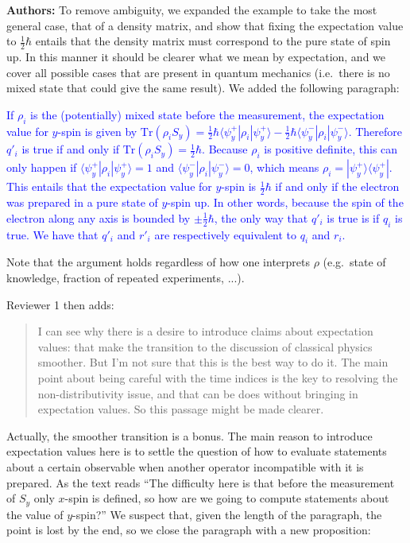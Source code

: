 \documentclass[11pt, executivepaper]{article}
\begin{document}
\begin{enumerate}
\vspace{2mm}

\textbf{Authors:} To remove ambiguity, we expanded the example to take the most general case, that of a density matrix, and show that fixing the expectation value to $\frac{1}{2} \hbar$ entails that the density matrix must correspond to the pure state of spin up. In this manner it should be clearer what we mean by expectation, and we cover all possible cases that are present in quantum mechanics (i.e.\ there is no mixed state that could give the same result). We added the following paragraph:

\textcolor{blue}{If $\rho_i$ is the (potentially) mixed state before the measurement, the expectation value for $y$-spin is given by $\text{Tr}(\rho_i S_y) = \frac{1}{2} \hbar \langle \psi_y^+ | \rho_i | \psi_y^+ \rangle - \frac{1}{2} \hbar \langle \psi_y^- | \rho_i | \psi_y^- \rangle$. Therefore $q'_i$ is true if and only if $\text{Tr}(\rho_i S_y) = \frac{1}{2} \hbar$. Because $\rho_i$ is positive definite, this can only happen if $\langle \psi_y^+ | \rho_i | \psi_y^+ \rangle = 1$ and $\langle \psi_y^- | \rho_i | \psi_y^- \rangle = 0$, which means $\rho_i = | \psi_y^+ \rangle \langle \psi_y^+ |$. This entails that the expectation value for $y$-spin is $\frac{1}{2} \hbar$ if and only if the electron was prepared in a pure state of $y$-spin up. In other words, because the spin of the electron along any axis is bounded by $\pm \frac{1}{2} \hbar$, the only way that $q'_i$ is true is if $q_i$ is true. We have that $q'_i$ and $r'_i$ are respectively equivalent to $q_i$ and $r_i$.}

Note that the argument holds regardless of how one interprets $\rho$ (e.g.\ state of knowledge, fraction of repeated experiments, ...). 
\vspace{2mm}

Reviewer 1 then adds:

\begin{quote}
I can see why there is a desire to introduce claims about expectation values: that make the transition to the discussion of classical physics smoother. But I'm not sure that this is the best way to do it. The main point about being careful with the time indices is the key to resolving the non-distributivity issue, and that can be does without bringing in expectation values. So this passage might be made clearer.
\end{quote}

Actually, the smoother transition is a bonus. The main reason to introduce expectation values here is to settle the question of how to evaluate statements about a certain observable when another operator incompatible with it is prepared. As the text reads ``The difficulty here is that before the measurement of $S_y$ only $x$-spin is defined, so how are we going to compute statements about the value of $y$-spin?'' We suspect that, given the length of the paragraph, the point is lost by the end, so we close the paragraph with a new proposition:


\end{enumerate}
\end{document}
